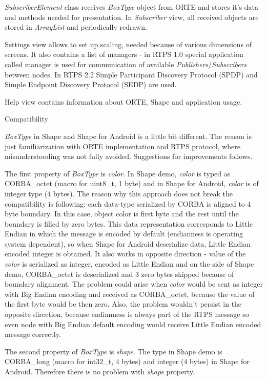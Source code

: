 {\em SubscriberElement} class receives {\em BoxType} object from ORTE and stores it's data and methods needed for presentation. In {\em Subscriber} view, all received objects are stored in {\em ArrayList} and periodically redrawn.

Settings view allows to set up scaling, needed because of various dimensions of screens. It also contains a list of managers - in RTPS 1.0 special application called manager is used for communication of available {\em Publishers}/{\em Subscribers} between nodes. In RTPS 2.2 Simple Participant Discovery Protocol (SPDP) and Simple Endpoint Discovery Protocol (SEDP) are used.

Help view contains information about ORTE, Shape and application usage.

\sec Compatibility

{\em BoxType} in Shape and Shape for Android is a little bit different. The reason is just familiarization with ORTE implementation and RTPS protocol, where misunderstooding was not fully avoided. Suggestions for improvements follows.

The first property of {\em BoxType} is {\em color}. In Shape demo, {\em color} is typed as CORBA\_octet (macro for uint8\_t, 1 byte) and in Shape for Android, {\em color} is of integer type (4 bytes). The reason why this approach does not break the compatibility is following: each data-type serialized by CORBA is aligned to 4 byte boundary. In this case, object color is first byte and the rest until the boundary is filled by zero bytes. This data representation corresponds to Little Endian in which the message is encoded by default (endianness is operating system dependent), so when Shape for Android deserialize data, Little Endian encoded integer is obtained. It also works in opposite direction - value of the {\em color} is serialized as integer, encoded as Little Endian and on the side of Shape demo, CORBA\_octet is deserialized and 3 zero bytes skipped because of boundary alignment. The problem could arise when {\em color} would be sent as integer with Big Endian encoding and received as CORBA\_octet, because the value of the first byte would be then zero. Also, the problem wouldn't persist in the opposite direction, because endianness is always part of the RTPS message so even node with Big Endian default encoding would receive Little Endian encoded message correctly.

The second property of {\em BoxType} is {\em shape}. The type in Shape demo is CORBA\_long (macro for int32\_t, 4 bytes) and integer (4 bytes) in Shape for Android. Therefore there is no problem with {\em shape} property.

